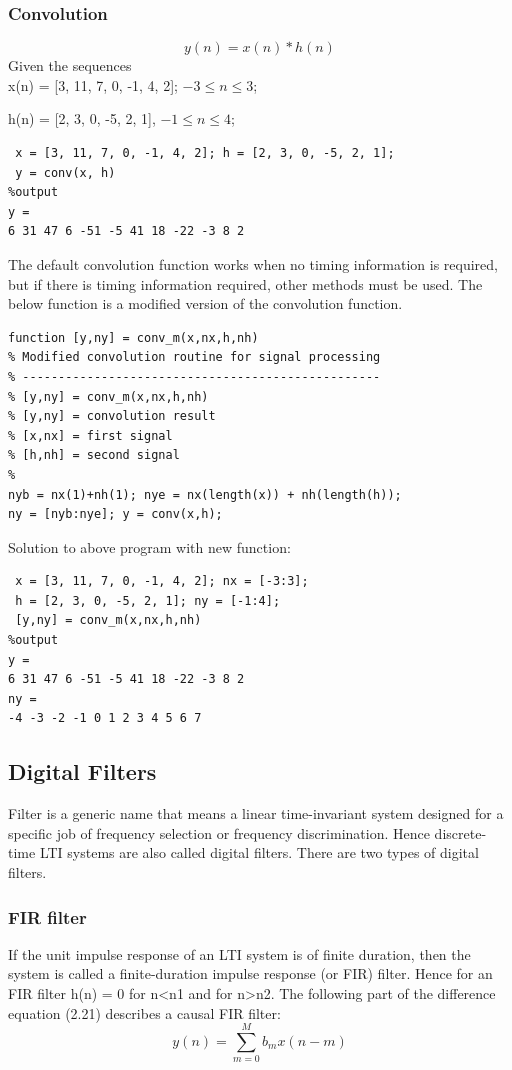 \documentclass{article}
\begin{document}
\subsubsection{Convolution}
\begin{equation}
y(n) = x(n)*h(n)
\end{equation}
Given the sequences \\
x(n) = [3, 11, 7, 0, -1, 4, 2]; $-3 \leq n \leq 3$;

h(n) = [2, 3, 0, -5, 2, 1], $-1 \leq n \leq 4$;

\begin{lstlisting}
 x = [3, 11, 7, 0, -1, 4, 2]; h = [2, 3, 0, -5, 2, 1];
 y = conv(x, h)
%output
y =
6 31 47 6 -51 -5 41 18 -22 -3 8 2    
\end{lstlisting}
The default convolution function works when no timing information is required, but if there is timing information required, other methods must be used. The below function is a modified version of the convolution function.
\begin{lstlisting}
function [y,ny] = conv_m(x,nx,h,nh)
% Modified convolution routine for signal processing
% --------------------------------------------------
% [y,ny] = conv_m(x,nx,h,nh)
% [y,ny] = convolution result
% [x,nx] = first signal
% [h,nh] = second signal
%
nyb = nx(1)+nh(1); nye = nx(length(x)) + nh(length(h));
ny = [nyb:nye]; y = conv(x,h);    
\end{lstlisting}
Solution to above program with new function:
\begin{lstlisting}
 x = [3, 11, 7, 0, -1, 4, 2]; nx = [-3:3];
 h = [2, 3, 0, -5, 2, 1]; ny = [-1:4];
 [y,ny] = conv_m(x,nx,h,nh)
%output 
y =
6 31 47 6 -51 -5 41 18 -22 -3 8 2
ny =
-4 -3 -2 -1 0 1 2 3 4 5 6 7
\end{lstlisting}

\subsection{Digital Filters}
Filter is a generic name that means a linear time-invariant system designed
for a specific job of frequency selection or frequency discrimination. Hence
discrete-time LTI systems are also called digital filters. There are two
types of digital filters.
\subsubsection{FIR filter}
If the unit impulse response of an LTI system is of finite
duration, then the system is called a finite-duration impulse response (or
FIR) filter. Hence for an FIR filter h(n) = 0 for n<n1 and for n>n2.
The following part of the difference equation (2.21) describes a causal FIR
filter:
\begin{equation}
y(n) = \sum_{m=0}^{M}b_mx(n-m)
\end{equation}
\end{document}
